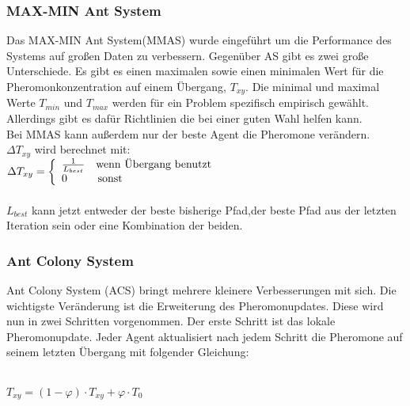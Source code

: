 \subsubsection{MAX-MIN Ant System}
Das MAX-MIN Ant System(MMAS) wurde eingeführt um die Performance des Systems auf großen Daten zu verbessern. Gegenüber AS gibt es zwei große Unterschiede. Es gibt es einen maximalen sowie einen minimalen Wert für die Pheromonkonzentration auf einem Übergang, $T_{xy}$. Die minimal und maximal Werte $T_{min}$ und $T_{max}$ werden für ein Problem spezifisch empirisch gewählt\cite{socha2002max}. Allerdings gibt es dafür Richtlinien die bei einer guten Wahl helfen kann\cite{STUTZLE2000889}.\\
Bei MMAS kann außerdem nur der beste Agent die Pheromone verändern.\\
$\Delta T_{xy}$ wird berechnet mit:\\
\large
$\Delta T_{xy}  = \left\{
  \begin{array}{ll}
  \frac{1}{L_{best}} & \normalsize\textrm{wenn Übergang benutzt} \\
  0 & \, \normalsize \textrm{sonst} \\
  \end{array}
  \right. $
  \normalsize\\\\
$L_{best}$ kann jetzt entweder der beste bisherige Pfad,der beste Pfad aus der letzten Iteration sein oder eine Kombination der beiden.\\
\subsubsection{Ant Colony System }
Ant Colony System (ACS) bringt mehrere kleinere Verbesserungen mit sich. Die wichtigste Veränderung ist die Erweiterung des Pheromonupdates. Diese wird nun in zwei Schritten vorgenommen. Der erste Schritt ist das lokale Pheromonupdate. Jeder Agent aktualisiert nach jedem Schritt die Pheromone auf seinem letzten Übergang mit folgender Gleichung:\\\\

\begin{large}
  $T_{xy}=(1-\varphi)\cdot T_{xy}+\varphi\cdot T_0$\\
\end{large}

